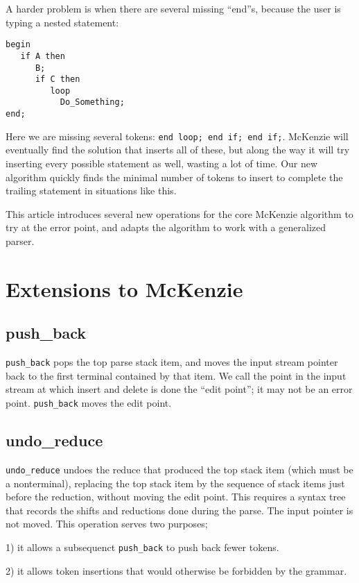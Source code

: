 \documentclass{article}
\begin{document}
A harder problem is when there are several missing ``end''s, because
the user is typing a nested statement:
\begin{verbatim}
begin
   if A then
      B;
      if C then
         loop
           Do_Something;
end;
\end{verbatim}

Here we are missing several tokens: \verb|end loop; end if; end if;|.
McKenzie will eventually find the solution that inserts all of these,
but along the way it will try inserting every possible statement as
well, wasting a lot of time. Our new algorithm quickly finds the
minimal number of tokens to insert to complete the trailing statement
in situations like this.

This article introduces several new operations for the core McKenzie
algorithm to try at the error point, and adapts the algorithm to work
with a generalized parser.


\section{Extensions to McKenzie}

\subsection{push\_back}
\verb|push_back| pops the top parse stack item, and moves the input
stream pointer back to the first terminal contained by that item. We
call the point in the input stream at which insert and delete is done
the ``edit point''; it may not be an error point. \verb|push_back|
moves the edit point.

\subsection{undo\_reduce}
\verb|undo_reduce| undoes the reduce that produced the top stack item
(which must be a nonterminal), replacing the top stack item by the
sequence of stack items just before the reduction, without
moving the edit point. This requires a syntax tree that records the
shifts and reductions done during the parse. The input pointer is not
moved. This operation serves two purposes;

1) it allows a subsequenct \verb|push_back| to push back fewer tokens.

2) it allows token insertions that would otherwise be forbidden by the
grammar.
\end{document}
